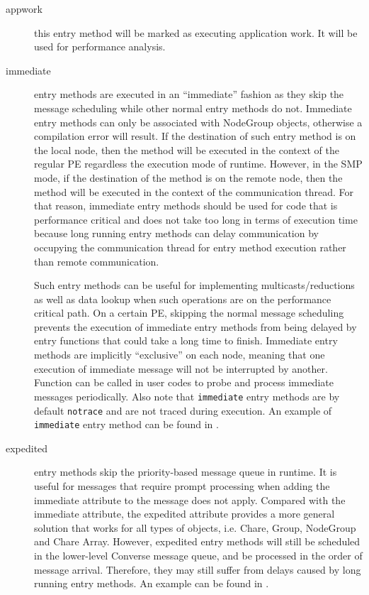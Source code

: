 \begin{description}
\item[appwork] this entry method will be marked as executing application work. It will be used for performance analysis.

\item[immediate] entry methods are executed in an
``immediate'' fashion as they skip the message scheduling while other normal
entry methods do not. Immediate entry methods can only be associated with
NodeGroup objects, otherwise a compilation error will result. If the
destination of such entry method is on the local node, then the method will be
executed in the context of the regular PE regardless the execution mode of
\charmpp{} runtime. However, in the SMP mode, if the destination of the method
is on the remote node, then the method will be executed in the context of the
communication thread. For that reason, immediate entry methods should be used
for code that is performance critical and does not take too long in terms of
execution time because long running entry methods can delay communication by
occupying the communication thread for entry method execution rather than
remote communication.

Such entry methods can be useful for implementing multicasts/reductions as well
as data lookup when such operations are on the performance critical path. On a
certain \charmpp{} PE, skipping the normal message scheduling prevents the
execution of immediate entry methods from being delayed by entry functions that
could take a long time to finish. Immediate entry methods are implicitly
``exclusive'' on each node, meaning that one execution of immediate message
will not be interrupted by another. Function  can be
called in user codes to probe and process immediate messages periodically. Also
note that \texttt{immediate} entry methods are by default \texttt{notrace} and are
not traced during execution. An example of \texttt{immediate} entry method
can be found in .

\item[expedited] entry methods skip the priority-based message
queue in \charmpp{} runtime. It is useful for messages that require prompt
processing when adding the immediate attribute to the message does not apply.
Compared with the immediate attribute, the expedited attribute provides a more
general solution that works for all types of \charmpp{} objects, i.e. Chare,
Group, NodeGroup and Chare Array. However, expedited entry methods will still
be scheduled in the lower-level Converse message queue, and be processed in the
order of message arrival. Therefore, they may still suffer from delays caused
by long running entry methods. An example can be found in 
.


\end{description}
